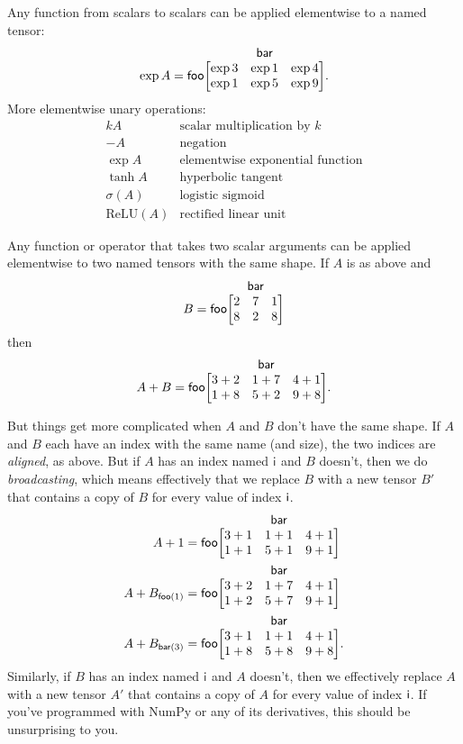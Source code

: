 \documentclass{article}
\makeatletter
\newcommand{\nmatrix}[3]{\name{#1}\begin{array}[b]{@{}c@{}}\name{#2}\\\begin{bmatrix}#3\end{bmatrix}\end{array}}
\makeatother
\begin{document}
Any function from scalars to scalars can be applied elementwise to a named tensor:
\begin{equation*}
\exp A = \nmatrix{foo}{bar}{
  \exp 3 & \exp 1 & \exp 4 \\
  \exp 1 & \exp 5 & \exp 9
}.
\end{equation*}
More elementwise unary operations:
\[\begin{array}{cl}
kA & \text{scalar multiplication by $k$} \\
-A & \text{negation} \\
\exp A & \text{elementwise exponential function} \\
\tanh A & \text{hyperbolic tangent} \\
\sigma(A) & \text{logistic sigmoid} \\
\text{ReLU}(A) & \text{rectified linear unit}
\end{array}\]

Any function or operator that takes two scalar arguments can be applied elementwise to two named tensors with the same shape. If $A$ is as above and
\begin{equation*}
B = \nmatrix{foo}{bar}{
  2 & 7 & 1 \\
  8 & 2 & 8
}
\end{equation*}
then
\begin{equation*}
A + B = \nmatrix{foo}{bar}{
  3+2 & 1+7 & 4+1 \\
  1+8 & 5+2 & 9+8
}.
\end{equation*}

But things get more complicated when $A$ and $B$ don't have the same shape. If $A$ and $B$ each have an index with the same name (and size), the two indices are \emph{aligned}, as above. But if $A$ has an index named $\mathsf{i}$ and $B$ doesn't, then we do \emph{broadcasting}, which means effectively that we replace $B$ with a new tensor $B'$ that contains a copy of $B$ for every value of index $\mathsf{i}$.
\begin{align*}
A + 1 &= \nmatrix{foo}{bar}{
  3+1 & 1+1 & 4+1 \\
  1+1 & 5+1 & 9+1
} \\
A + B_{\nidx{foo}{1}} &= \nmatrix{foo}{bar}{
  3+2 & 1+7 & 4+1 \\
  1+2 & 5+7 & 9+1
} \\
A + B_{\nidx{bar}{3}} &= \nmatrix{foo}{bar}{
  3+1 & 1+1 & 4+1 \\
  1+8 & 5+8 & 9+8
}.
\end{align*}
Similarly, if $B$ has an index named $\mathsf{i}$ and $A$ doesn't, then we effectively replace $A$ with a new tensor $A'$ that contains a copy of $A$ for every value of index $\mathsf{i}$. If you've programmed with NumPy or any of its derivatives, this should be unsurprising to you.
\end{document}
